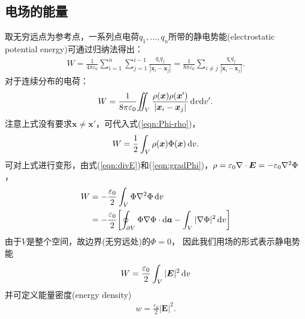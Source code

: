 \subsection{电场的能量}
取无穷远点为参考点，一系列点电荷$q_1,\ldots,q_n$所带的静电势能(electrostatic potential energy)可通过归纳法得出：
\begin{align}
    W=\frac1{4\pi\varepsilon_0}\sum_{i=1}^n\sum_{j=1}^{i-1}\frac{q_iq_j}{|\bm x_i-\bm x_j|}=\frac1{8\pi\varepsilon_0}\sum_{i\neq j}\frac{q_iq_j}{|\bm x_i-\bm x_j|}.
\end{align}
对于连续分布的电荷：
\begin{align*}
    \label{eqn:W-qq}
    W=\frac1{8\pi\varepsilon_0}\hspace{-2 pt}\int\hspace{-8 pt}\int_V\frac{\rho(\bm x)\rho(\bm x')}{|\bm x_i-\bm x_j|}\mathop{}\!\mathrm{d} v\mathrm{d} v'.
\end{align*}
注意上式没有要求$\bm x\neq\bm x'$，可代入式(\ref{eqn:Phi-rho})，
\begin{align}
    W=\frac12\int_V\rho(\bm x)\Phi(\bm x)\mathop{}\!\mathrm{d} v.
\end{align}
可对上式进行变形，由式(\ref{eqn:divE})和(\ref{eqn:gradPhi})，$\rho=\varepsilon_0\nabla\cdot\bm E=-\varepsilon_0\nabla^2\Phi$，
\begin{align*}
    W&=-\frac{\varepsilon_0}2\int_V\Phi\nabla^2\Phi\mathop{}\!\mathrm{d} v\\
    &=-\frac{\varepsilon_0}2\biggl[\oint_{\partial V}\Phi\nabla\Phi\cdot\mathop{}\!\mathrm{d}\bm a-\int_V|\nabla\Phi|^2\mathop{}\!\mathrm{d} v\biggr]
\end{align*}
由于$V$是整个空间，故边界(无穷远处)的$\Phi=0$，
因此我们用场的形式表示静电势能
\begin{align}
    \label{eqn:W-E}
    W=\frac{\varepsilon_0}2\int_V|\bm E|^2\mathop{}\!\mathrm{d} v
\end{align}
并可定义能量密度(energy density)
\begin{align}
    w=\frac{\varepsilon_0}2|\bm E|^2.
\end{align}

